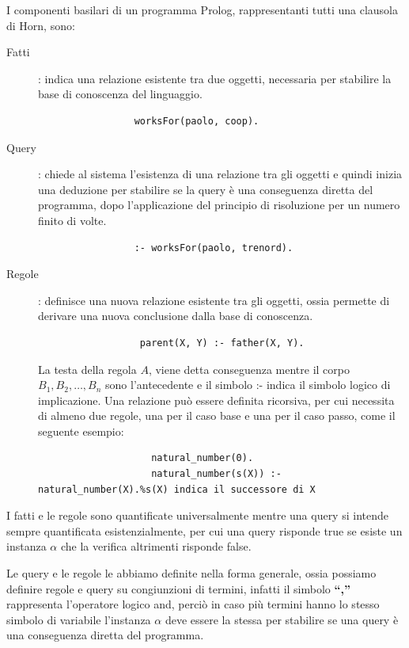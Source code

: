 \documentclass[a4paper]{book}
\begin{document}
I componenti basilari di un programma Prolog, rappresentanti tutti una clausola di Horn, sono:
\begin{description}
\item [Fatti]: indica una relazione esistente tra due oggetti, necessaria per stabilire la base di conoscenza del linguaggio.
               \begin{verbatim}
                 worksFor(paolo, coop).
               \end{verbatim}
\item [Query]: chiede al sistema l'esistenza di una relazione tra gli oggetti e quindi inizia una deduzione per stabilire se la query
               è una conseguenza diretta del programma, dopo l'applicazione del principio di risoluzione per un numero finito di volte.
               \begin{verbatim}
                 :- worksFor(paolo, trenord).
               \end{verbatim}

\item [Regole]: definisce una nuova relazione esistente tra gli oggetti, ossia permette di derivare una nuova conclusione dalla base di conoscenza.
                \begin{verbatim}
                  parent(X, Y) :- father(X, Y).
                \end{verbatim}
                La testa della regola $A$, viene detta conseguenza mentre il corpo $B_1, B_2, \dots, B_n$ sono l'antecedente
                e il simbolo :- indica il simbolo logico di implicazione.\newline
                Una relazione può essere definita ricorsiva, per cui necessita di almeno due regole, una per il caso base e
                una per il caso passo, come il seguente esempio:
                \begin{verbatim}
                    natural_number(0).
                    natural_number(s(X)) :- natural_number(X).%s(X) indica il successore di X
                \end{verbatim}
\end{description}
I fatti e le regole sono quantificate universalmente mentre una query si intende sempre quantificata esistenzialmente, per cui una query
risponde true se esiste un instanza $\alpha$ che la verifica altrimenti risponde false.

Le query e le regole le abbiamo definite nella forma generale, ossia possiamo definire regole e query su congiunzioni di termini,
infatti il simbolo \textbf{``,''} rappresenta l'operatore logico and, perciò in caso più termini hanno lo stesso simbolo di variabile
l'instanza $\alpha$ deve essere la stessa per stabilire se una query è una conseguenza diretta del programma.
\end{document}
